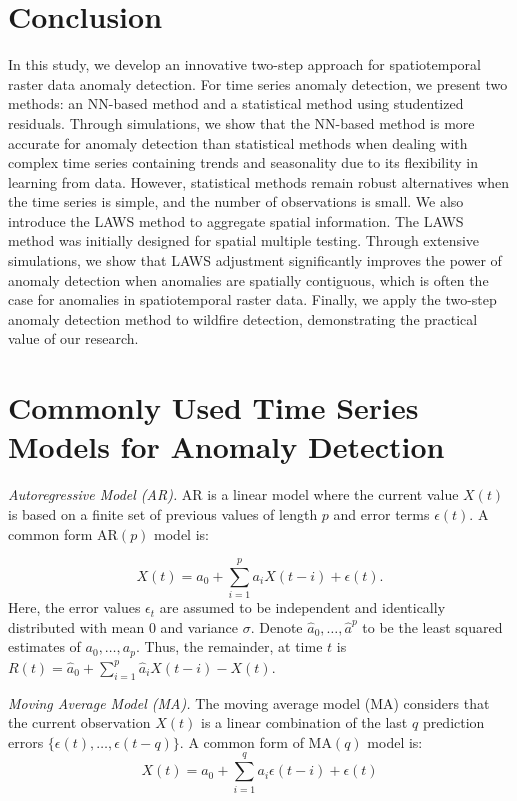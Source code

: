 \documentclass[11pt]{article}
\begin{document}
\section{Conclusion}
In this study, we develop an innovative two-step approach for spatiotemporal raster data anomaly detection. For time series anomaly detection, we present two methods: an NN-based method and a statistical method using studentized residuals. Through simulations, we show that the NN-based method is more accurate for anomaly detection than statistical methods when dealing with complex time series containing trends and seasonality due to its flexibility in learning from data. However, statistical methods remain robust alternatives when the time series is simple, and the number of observations is small. We also introduce the LAWS method to aggregate spatial information. The LAWS method was initially designed for spatial multiple testing. Through extensive simulations, we show that LAWS adjustment significantly improves the power of anomaly detection when anomalies are spatially contiguous, which is often the case for anomalies in spatiotemporal raster data. Finally, we apply the two-step anomaly detection method to wildfire detection, demonstrating the practical value of our research.






\clearpage

\appendix
\section{Commonly Used Time Series Models for Anomaly Detection}

\textit{Autoregressive Model (AR).} AR is a linear model where the current value $X(t)$ is based on a finite set of previous values of length $p$ and error terms $\epsilon(t)$. A common form AR$(p)$ model is:

\begin{equation}\label{eq:ar}
	X(t) = a_0 + \sum_{i=1}^{p}a_iX(t-i) + \epsilon(t).
\end{equation}
Here, the error values $\epsilon_t$ are assumed to be independent and identically distributed with mean 0 and variance $\sigma$. Denote $\hat{a}_0,\ldots, \hat{a}^p$ to be the least squared estimates of $a_0,\ldots, a_p$. Thus, the remainder,  at time $t$ is $R(t)=\hat{a}_0 + \sum_{i=1}^{p}\hat{a}_iX(t-i) - X(t)$.

\textit{Moving Average Model (MA).} The moving average model (MA) considers that the current observation $X(t)$ is a linear combination of the last $q$ prediction errors $\{\epsilon(t),\ldots,\epsilon(t-q)\}$. A common form of MA$(q)$ model is:
\begin{equation}
	X(t) = a_0+\sum_{i=1}^q a_i\epsilon(t-i)+\epsilon(t)
\end{equation}
\end{document}
